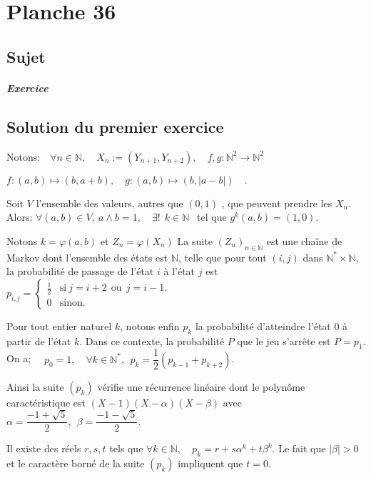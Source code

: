 \chapter{Planche 36}

\section{Sujet}

\paragraph{Exercice}

\section{Solution du premier exercice}
Notons:$\quad\forall n \in \mathbb N  ,\quad X_n := (Y_{n+1},Y_{n+2}),\quad f,g: \mathbb N^2 \to \mathbb N^2 \quad$
 
 $ f:(a,b)\mapsto (b,a+b), \quad g:(a,b) \mapsto (b,|a-b|)\quad.$
  
 
  Soit $V$ l'ensemble des valeurs, autres que $(0,1)$ , que peuvent prendre les $X_n.\quad$ Alors: $\forall (a,b) \in V,\: a\wedge b =1, \quad \exists !\:\: k \in \mathbb N \:\:$ tel que $g^k (a,b) =(1,0).$
 
  Notons $k= \varphi (a,b)$ et $Z_n = \varphi (X_n)$
  La suite $(Z_n) _{n\in \mathbb N} $ est une chaîne de Markov dont l'ensemble des états est $\mathbb N$, telle que pour tout $(i,j)$ dans $\mathbb N^*\times \mathbb N$, la probabilité de passage de l'état $i$ à l'état $j$ est $p_{i,j} = \left\{ \begin{array} {cl} \frac12& \text{si}\: j=i+2 \: \:\text{ou}\:\: j=i-1. \\ 0 &\text{sinon}. \end{array} \right.$
  
  Pour tout entier naturel $k$, notons enfin $p_k$ la probabilité d'atteindre l'état $0$ à partir de l'état $k$. 
  Dans ce contexte, la probabilité $P$ que le jeu s'arrête est $P = p_1.$
  On a; $\quad p_0 =1,\quad \forall k\in \mathbb N^*, \:\: p_k = \dfrac 12 ( p_{k-1} + p_{k+2})$.
 
  Ainsi la suite $(p_k)$ vérifie une récurrence linéaire dont le polynôme caractéristique est $(X-1)(X-\alpha)(X- \beta)$ avec $\alpha =\dfrac {-1+\sqrt5}2,\:\: \beta = \dfrac{-1-\sqrt 5}2.$
  
  Il existe des réels $r,s,t$ tels que $\forall k \in \mathbb N, \quad p_k =r+s\alpha ^k+t \beta^k.$
  Le fait que $|\beta| >0 $ et le caractère borné de la suite $(p_k)$ impliquent   que $t=0.$
  
